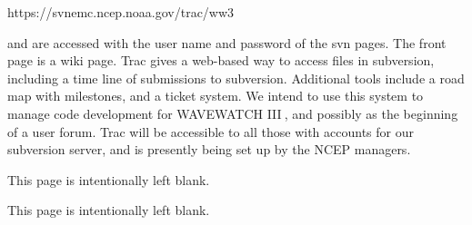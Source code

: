 \documentclass[12pt]{article}
\newcommand{\ww}{WAVEWATCH III$\:$\texttrademark}
\newcommand{\file}{\sf}
\newcommand{\pb}{\strut \vfill \pagebreak}
\newcommand{\bpage}{\vfill \pagebreak \strut

\vspace{2.5in} \centerline{This page is intentionally left blank.}}
\newcommand{\bpagea}{\strut

\vspace{2.5in} \centerline{This page is intentionally left blank.}}
\begin{document}
\vspace{\baselineskip}
\centerline{\file https://svnemc.ncep.noaa.gov/trac/ww3}
\vspace{\baselineskip}

\noindent
and are accessed with the user name and password of the svn pages. The front
page is a wiki page. Trac gives a web-based way to access files in subversion,
including a time line of submissions to subversion. Additional tools include a
road map with milestones, and a ticket system. We intend to use this system to
manage code development for \ww, and possibly as the beginning of a user
forum. Trac will be accessible to all those with accounts for our subversion
server, and is presently being set up by the NCEP managers.


\bpage
\pb
\setcounter{footnote}{0}


%


\pb
\pagestyle{empty}
\bpagea
\end{document}
